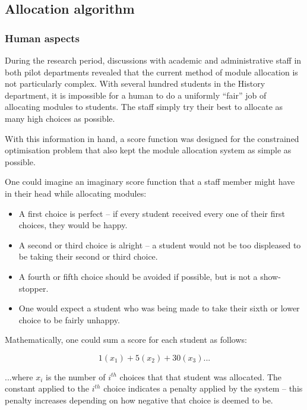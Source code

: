 
\subsection{Allocation algorithm}



\subsubsection{Human aspects}
\label{sec:algo_humanaspects}

During the research period, discussions with academic and administrative staff
in both pilot departments revealed that the current method of module
allocation is not particularly complex. With several hundred students in the
History department, it is impossible for a human to do a uniformly ``fair''
job of allocating modules to students. The staff simply try their best to
allocate as many high choices as possible.

With this information in hand, a score function was designed for the
constrained optimisation problem that also kept the module allocation system
as simple as possible.

One could imagine an imaginary score function that a staff member might have
in their head while allocating modules:

\begin{itemize}
  \item A first choice is perfect -- if every student received every one of
        their first choices, they would be happy.
  \item A second or third choice is alright -- a student would not be too
        displeased to be taking their second or third choice.
  \item A fourth or fifth choice should be avoided if possible, but is not a
        show-stopper.
  \item One would expect a student who was being made to take their sixth or
        lower choice to be fairly unhappy.
\end{itemize}

Mathematically, one could sum a score for each student as follows:

$$
1(x_1) + 5(x_2) + 30(x_3) ...
$$

...where $x_i$ is the number of $i^{th}$ choices that that student was
allocated. The constant applied to the $i^{th}$ choice indicates a penalty
applied by the system -- this penalty increases depending on how negative that
choice is deemed to be.

